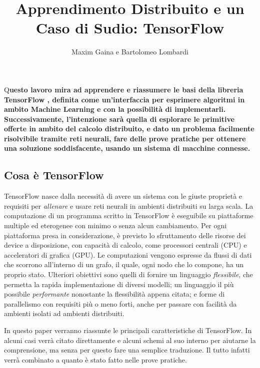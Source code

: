 \documentclass[DIV=calc, paper=a4, fontsize=11pt]{scrartcl}	 %
\title{Apprendimento Distribuito e un Caso di Sudio: TensorFlow} %
\author{Maxim Gaina e Bartolomeo Lombardi} %
\date{} %
\newcommand{\initial}[1]{ %
\lettrine[lines=3,lhang=0.3,nindent=0em]{
\color{DarkGoldenrod}
{\textsf{#1}}}{}}
\begin{document}
	\maketitle
	\thispagestyle{fancy}
	\initial{Q}\textbf{uesto lavoro mira ad apprendere e riassumere le basi della libreria TensorFlow \cite{tf}, definita come un'interfaccia per esprimere algoritmi in ambito Machine Learning e con la possibilità di implementarli. Successivamente, l'intenzione sarà quella di esplorare le primitive offerte in ambito del calcolo distribuito, e dato un problema facilmente risolvibile tramite reti neurali, fare delle prove pratiche per ottenere una soluzione soddisfacente, usando un sistema di macchine connesse.}
	
	\begin{multicols}{2}
		\tableofcontents
		\section*{Cosa è TensorFlow}
			TensorFlow nasce dalla necessità di avere un sistema con le giuste proprietà e requisiti per \textit{allenare} e usare reti neurali in ambienti distribuiti su larga scala. La computazione di un programma scritto in TensorFlow è eseguibile su piattaforme multiple ed eterogenee con minimo o senza alcun cambiamento. Per ogni piattaforma presa in considerazione, è previsto lo sfruttamento delle risorse dei device a disposizione, con capacità di calcolo, come processori centrali (CPU) e acceleratori di grafica (GPU). Le computazioni vengono espresse da flussi di dati che scorrono all'interno di un grafo, il quale, ogni nodo che lo compone, ha un proprio stato. Ulteriori obiettivi sono quelli di fornire un linguaggio \textit{flessibile}, che permetta la rapida implementazione di diversi modelli; un linguaggio il più possibile \textit{performante} nonostante la flessibilità appena citata; e forme di parallelismo con requisiti più o meno forti, anche per passare con facilità da ambienti isolati ad ambienti distribuiti.
			
			In questo paper verranno riassunte le principali caratteristiche di TensorFlow. In alcuni casi verrà citato direttamente \cite{tf} e alcuni schemi al suo interno per aiutarne la comprensione, ma senza per questo fare una semplice traduzione. Il tutto infatti verrà combinato a quanto è stato fatto nelle prove pratiche.
			

\end{multicols}
\end{document}
